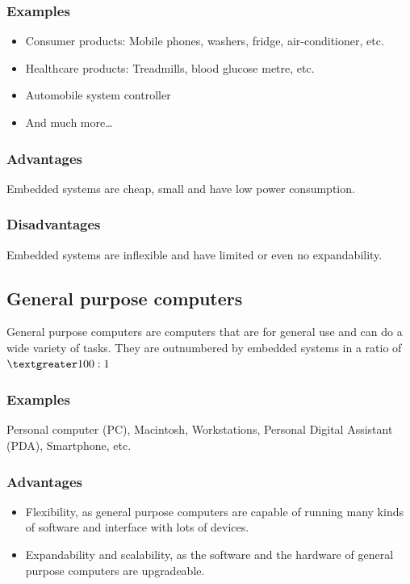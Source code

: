 \documentclass[11pt]{article}
\begin{document}
\subsubsection{Examples}
\label{sec:orgd962aab}
\begin{itemize}
\item Consumer products: Mobile phones, washers, fridge, air-conditioner, etc.
\item Healthcare products: Treadmills, blood glucose metre, etc.
\item Automobile system controller
\item And much more\ldots{}
\end{itemize}

\subsubsection{Advantages}
\label{sec:orgf591c7d}
Embedded systems are cheap, small and have low power consumption.

\subsubsection{Disadvantages}
\label{sec:orgbb3a5ce}
Embedded systems are inflexible and have limited or even no expandability.

\subsection{General purpose computers}
\label{sec:orgfb7b59a}
General purpose computers are computers that are for general use and can do a wide variety of tasks. They are outnumbered by embedded systems in a ratio of \(\textgreater 100:1\)

\subsubsection{Examples}
\label{sec:org0b9b748}
Personal computer (PC), Macintosh, Workstations, Personal Digital Assistant (PDA), Smartphone, etc.

\subsubsection{Advantages}
\label{sec:orgeb3fddd}
\begin{itemize}
\item Flexibility, as general purpose computers are capable of running many kinds of software and interface with lots of devices.
\item Expandability and scalability, as the software and the hardware of general purpose computers are upgradeable.
\end{itemize}
\end{document}
